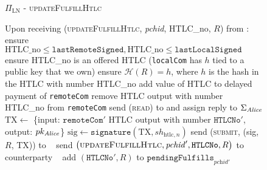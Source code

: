   \begin{figure}[H]
    \begin{protocolbox}{$\Pi_{\mathrm{LN}}$ - \textsc{updateFulfillHtlc}}
      \begin{algorithmic}[1]
        \State Upon receiving (\textsc{updateFulfillHtlc}, \textit{pchid},
        HTLC\_no, $R$) from \bob:
        \Indent
          \State ensure $\mathrm{HTLC\_no} \leq \mathtt{lastRemoteSigned},
          \mathrm{HTLC\_no} \leq \mathtt{lastLocalSigned}$
          \State ensure HTLC\_no is an offered HTLC (\texttt{localCom} has $h$
          tied to a public key that we own)
          \State ensure $\mathcal{H}\left(R\right) = h$, where $h$ is the hash
          in the HTLC with number HTLC\_no
          \State add value of HTLC to delayed payment of \texttt{remoteCom}
          \State remove HTLC output with number HTLC\_no from \texttt{remoteCom}
           
              \State send (\textsc{read}) to \ledger{} and assign reply to
              $\Sigma_{\mathit{Alice}}$
                \State $\mathrm{TX} \gets$ \{input: $\mathtt{remoteCom}'$ HTLC
                output with number $\mathtt{HTLCNo}'$, output: $pk_{\mathit{Alice}}$\}
                \State $\mathrm{sig} \gets \mathtt{signature}\left(\mathrm{TX},
                sh_{\mathrm{htlc}, n}\right)$
                \State send (\textsc{submit}, (sig, $R$, TX)) to \ledger{}
                \label{alg:protocol:pay:updateFulfillHtlc:submit}
              \Else \ 
                \State send $\left(\textsc{updateFulfillHtlc}, \mathit{pchid}',
                \mathtt{HTLCNo}, R\right)$ to counterparty
              \EndIf
            \Else \ 
              \State add $\left(\mathtt{HTLCNo}', R\right)$ to
              $\mathtt{pendingFulfills}_{\textit{pchid}'}$
            \EndIf
          \EndIf
        \EndIndent
      \end{algorithmic}
    \end{protocolbox}
    \caption{}
    \label{alg:protocol:pay:updateFulfillHtlc}
  \end{figure}


